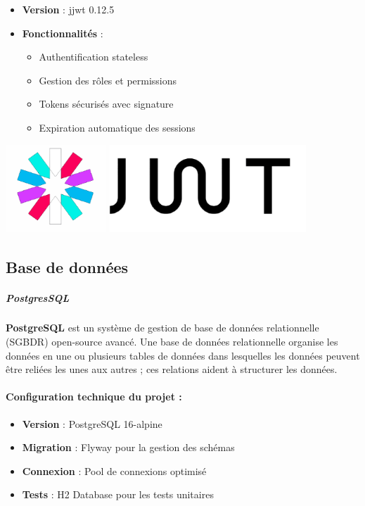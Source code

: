 \documentclass[12pt,a4paper,twoside]{report}
\begin{document}
\begin{itemize}
\item
  \textbf{Version} : jjwt 0.12.5
\item
  \textbf{Fonctionnalités} :

  \begin{itemize}
  \item
    Authentification stateless
  \item
    Gestion des rôles et permissions
  \item
    Tokens sécurisés avec signature
  \item
    Expiration automatique des sessions
  \end{itemize}
\end{itemize}

\includegraphics[width=4.44306in,height=1.30208in]{latex_media/media/image25.png}

\hypertarget{base-de-donnuxe9es}{%
\subsection{\texorpdfstring{Base de données
}{Base de données }}\label{base-de-donnuxe9es}}

\hypertarget{postgressql}{%
\subparagraph{\texorpdfstring{\textbf{PostgresSQL}~}{PostgresSQL~}}\label{postgressql}}

\textbf{PostgreSQL} est un système de gestion de base de données
relationnelle (SGBDR) open-source avancé. Une base de données
relationnelle organise les données en une ou plusieurs tables de données
dans lesquelles les données peuvent être reliées les unes aux autres ;
ces relations aident à structurer les données.

\hypertarget{configuration-technique-du-projet-3}{%
\paragraph{\texorpdfstring{\textbf{Configuration technique du projet
:}}{Configuration technique du projet :}}\label{configuration-technique-du-projet-3}}

\begin{itemize}
\item
  \textbf{Version} : PostgreSQL 16-alpine
\item
  \textbf{Migration} : Flyway pour la gestion des schémas
\item
  \textbf{Connexion} : Pool de connexions optimisé
\item
  \textbf{Tests} : H2 Database pour les tests unitaires
\end{itemize}
\end{document}

